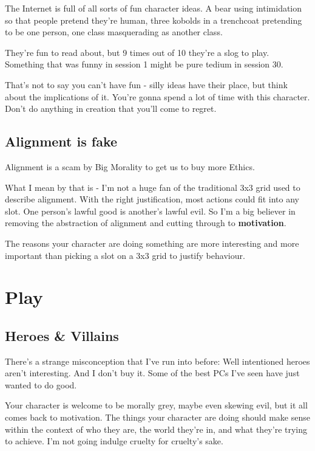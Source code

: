 The Internet is full of all sorts of fun character ideas. A bear using intimidation so that people pretend they're human, three kobolds in a trenchcoat pretending to be one person, one class masquerading as another class.

They're fun to read about, but 9 times out of 10 they're a slog to play. Something that was funny in session 1 might be pure tedium in session 30.

That's not to say you can't have fun - silly ideas have their place, but think about the implications of it. You're gonna spend a lot of time with this character. Don't do anything in creation that you'll come to regret.

\subsection {Alignment is fake}

Alignment is a scam by Big Morality to get us to buy more Ethics.

What I mean by that is - I'm not a huge fan of the traditional 3x3 grid used to describe alignment. With the right justification, most actions could fit into any slot. One person's lawful good is another's lawful evil. So I'm a big believer in removing the abstraction of alignment and cutting through to \textbf{motivation}.

The reasons your character are doing something are more interesting and more important than picking a slot on a 3x3 grid to justify behaviour.

\section {Play}

\subsection {Heroes \& Villains}

There's a strange misconception that I've run into before: Well intentioned heroes aren't interesting. And I don't buy it. Some of the best PCs I've seen have just wanted to do good.

Your character is welcome to be morally grey, maybe even skewing evil, but it all comes back to motivation. The things your character are doing should make sense within the context of who they are, the world they're in, and what they're trying to achieve. I'm not going indulge cruelty for cruelty's sake.

